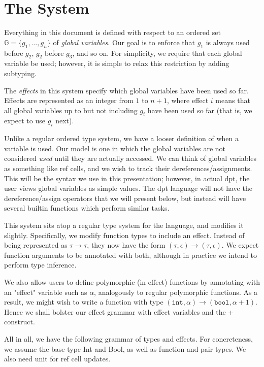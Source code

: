 \documentclass{article}
\begin{document}
\section*{The System}
Everything in this document is defined with respect to an ordered set $\mathbb{G} = \{g_1, \dots, g_n\}$ of \emph{global variables}. Our goal is to enforce that $g_1$ is always used before $g_2$, $g_2$ before $g_3$, and so on. For simplicity, we require that each global variable be used; however, it is simple to relax this restriction by adding subtyping.

The \emph{effects} in this system specify which global variables have been used so far. Effects are represented as an integer from $1$ to $n+1$, where effect $i$ means that all global variables up to but not including $g_i$ have been used so far (that is, we expect to use $g_i$ next).

Unlike a regular ordered type system, we have a looser definition of when a variable is used. Our model is one in which the global variables are not considered \emph{used} until they are actually accessed. We can think of global variables as something like ref cells, and we wish to track their dereferences/assignments. This will be the syntax we use in this presentation; however, in actual dpt, the user views global variables as simple values. The dpt language will not have the dereference/assign operators that we will present below, but instead will have several builtin functions which perform similar tasks.

This system sits atop a regular type system for the language, and modifies it slightly. Specifically, we modify function types to include an effect. Instead of being represented as $\tau \rightarrow \tau$, they now have the form $(\tau, \epsilon) \rightarrow (\tau, \epsilon)$. We expect function arguments to be annotated with both, although in practice we intend to perform type inference.

We also allow users to define polymorphic (in effect) functions by annotating with an "effect" variable such as $\alpha$, analogously to regular polymorphic functions. As a result, we might wish to write a function with type $(\texttt{int}, \alpha) \rightarrow (\texttt{bool}, \alpha+1)$. Hence we shall bolster our effect grammar with effect variables and the + construct.

All in all, we have the following grammar of types and effects. For concreteness, we assume the base type Int and Bool, as well as function and pair types. We also need unit for ref cell updates.
\end{document}
